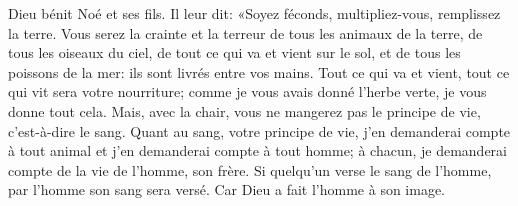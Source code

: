 Dieu bénit Noé et ses fils.
Il leur dit: «Soyez féconds, multipliez-vous, remplissez la terre.
Vous serez la crainte et la terreur de tous les animaux de la terre,
	de tous les oiseaux du ciel, de tout ce qui va et vient sur le sol,
	et de tous les poissons de la mer: ils sont livrés entre vos mains.
Tout ce qui va et vient, tout ce qui vit sera votre nourriture;
	comme je vous avais donné l’herbe verte, je vous donne tout cela.
Mais, avec la chair, vous ne mangerez pas le principe de vie,
	c’est-à-dire le sang.
Quant au sang, votre principe de vie, j’en demanderai compte à tout animal
	et j’en demanderai compte à tout homme;
	à chacun, je demanderai compte de la vie de l’homme, son frère.
Si quelqu’un verse le sang de l’homme, par l’homme son sang sera versé.
	Car Dieu a fait l’homme à son image.
